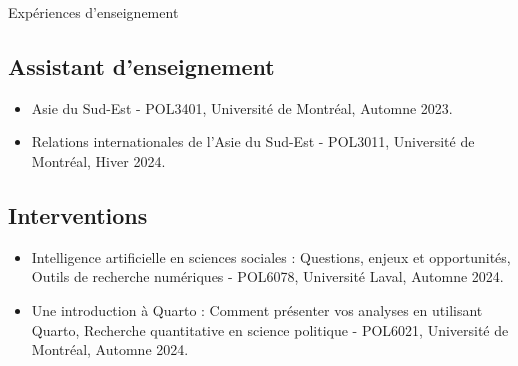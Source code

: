 \documentclass{resume} %
\begin{document}

\begin{rSection}{Expériences d'enseignement}
    \subsection*{Assistant d'enseignement}
        \begin{itemize}
            \item Asie du Sud-Est - POL3401, Université de Montréal, Automne 2023.
            \item Relations internationales de l'Asie du Sud-Est - POL3011, Université de Montréal, Hiver 2024.
        \end{itemize}
    \subsection*{Interventions}
        \begin{itemize}
            \item Intelligence artificielle en sciences sociales : Questions, enjeux et opportunités, Outils de recherche numériques - POL6078, Université Laval, Automne 2024.
            \item Une introduction à Quarto : Comment présenter vos analyses en utilisant Quarto, Recherche quantitative en science politique - POL6021, Université de Montréal, Automne 2024.
        \end{itemize}
        
\end{rSection}

\end{document}
